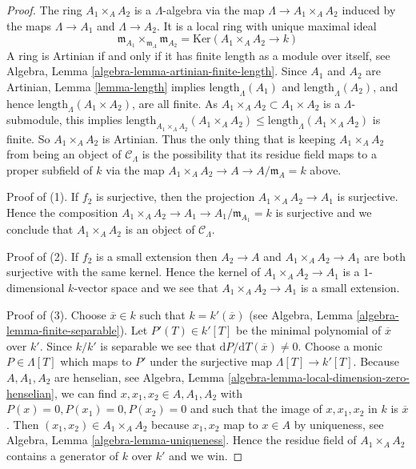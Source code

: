 \begin{proof}
The ring $A_1 \times_A A_2$ is a $\Lambda$-algebra via  the map
$\Lambda \to A_1 \times_A A_2$ induced by the maps
$\Lambda \to A_1$ and $\Lambda \to A_2$. It is a local ring with unique
maximal ideal
$$
\mathfrak m_{A_1} \times_{\mathfrak m_A} \mathfrak m_{A_2} =
\text{Ker}(A_1 \times_A A_2 \longrightarrow k)
$$
A ring is Artinian if and only if it has finite length as a module
over itself, see
Algebra, Lemma \ref{algebra-lemma-artinian-finite-length}.
Since $A_1$ and $A_2$ are Artinian, Lemma \ref{lemma-length} implies
$\text{length}_\Lambda(A_1)$ and $\text{length}_\Lambda(A_2)$,
and hence $\text{length}_\Lambda(A_1 \times A_2)$, are all finite.  As
$A_1 \times_A A_2 \subset A_1 \times A_2$ is a $\Lambda$-submodule, this
implies
$\text{length}_{A_1 \times_A A_2}(A_1 \times_A A_2) \leq
\text{length}_\Lambda(A_1 \times_A A_2)$ is finite. So $A_1
\times_A A_2$ is Artinian. Thus the only thing that is keeping
$A_1 \times_A A_2$ from being an object of $\mathcal{C}_\Lambda$ is
the possibility that its residue field maps to a proper subfield of $k$
via the map $A_1 \times_A A_2 \to A \to A/\mathfrak m_A = k$ above.

\medskip \noindent
Proof of (1). If $f_2$ is surjective, then the projection
$A_1 \times_A A_2 \to A_1$ is surjective. Hence the composition
$A_1 \times_A A_2 \to A_1 \to A_1/\mathfrak m_{A_1} = k$ is surjective
and we conclude that $A_1 \times_A A_2$ is an object of $\mathcal{C}_\Lambda$.

\medskip\noindent
Proof of (2). If $f_2$ is a small extension then $A_2 \to A$ and
$A_1 \times_A A_2  \to A_1$ are both surjective with the same kernel.
Hence the kernel of $A_1 \times_A A_2  \to A_1$ is a $1$-dimensional
$k$-vector space and we see that $A_1 \times_A A_2  \to A_1$ is a small
extension.

\medskip\noindent
Proof of (3). Choose $\overline{x} \in k$ such that
$k = k'(\overline{x})$ (see
Algebra, Lemma \ref{algebra-lemma-finite-separable}).
Let $P'(T) \in k'[T]$ be the minimal polynomial of $\overline{x}$ over $k'$.
Since $k/k'$ is separable we see that
$\text{d}P/\text{d}T(\overline{x}) \not = 0$.
Choose a monic $P \in \Lambda[T]$ which maps to $P'$ under the surjective map
$\Lambda[T] \to k'[T]$. Because $A, A_1, A_2$ are henselian, see
Algebra, Lemma \ref{algebra-lemma-local-dimension-zero-henselian},
we can find $x, x_1, x_2 \in A, A_1, A_2$ with $P(x) = 0, P(x_1) = 0,
P(x_2) = 0$ and such that the image of $x, x_1, x_2$ in $k$ is $\overline{x}$.
Then $(x_1, x_2) \in A_1 \times_A A_2$ because $x_1, x_2$
map to $x \in A$ by uniqueness, see
Algebra, Lemma \ref{algebra-lemma-uniqueness}.
Hence the residue field of
$A_1 \times_A A_2$ contains a generator of $k$ over $k'$ and we win.
\end{proof}

